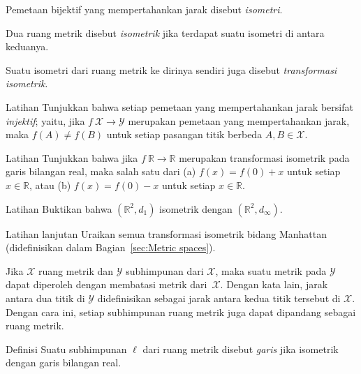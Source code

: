 Pemetaan bijektif yang mempertahankan jarak disebut \emph{isometri}. 

Dua ruang metrik disebut \emph{isometrik} jika terdapat suatu isometri di antara keduanya.

Suatu isometri dari ruang metrik ke dirinya sendiri juga disebut \emph{transformasi isometrik}.

\begin{thm}{Latihan}\label{ex:dist-preserv=>injective}
Tunjukkan bahwa setiap pemetaan yang mempertahankan jarak bersifat \emph{injektif};
yaitu, jika $f\:\mathcal X\to\mathcal Y$ merupakan pemetaan yang mempertahankan jarak, 
maka $f(A)\ne f(B)$ untuk setiap pasangan titik berbeda $A, B\in \mathcal X$.
\end{thm}

\begin{thm}[!]{Latihan}\label{ex:motion-of-R}
Tunjukkan bahwa jika $f\:\mathbb{R}\to\mathbb{R}$ merupakan transformasi isometrik pada garis bilangan real,
maka salah satu dari (a)
$f(x)=f(0)+x$ untuk setiap $x\in \mathbb{R}$, 
atau (b)
$f(x)=f(0)-x$ untuk setiap $x\in \mathbb{R}$. 

\end{thm}

\begin{thm}{Latihan}\label{ex:d_1=d_infty}
Buktikan bahwa $(\mathbb{R}^2,d_1)$ isometrik dengan $(\mathbb{R}^2,d_\infty)$.
\end{thm}

\begin{thm}{Latihan lanjutan}\label{ad-ex:motions of Manhattan plane}
Uraikan semua transformasi isometrik bidang Manhattan (didefinisikan dalam Bagian~\ref{sec:Metric spaces}).
\end{thm}

Jika $\mathcal X$ ruang metrik dan $\mathcal Y$ subhimpunan dari $\mathcal X$,
maka suatu metrik pada $\mathcal Y$ dapat diperoleh dengan membatasi metrik dari~$\mathcal X$. 
Dengan kata lain, 
jarak antara dua titik di $\mathcal Y$ didefinisikan sebagai jarak antara kedua titik tersebut di $\mathcal X$.
Dengan cara ini, setiap subhimpunan ruang metrik juga dapat dipandang sebagai ruang metrik.

\begin{thm}{Definisi}\label{def:line}
Suatu subhimpunan $\ell$ dari ruang metrik disebut \emph{garis} jika isometrik dengan garis bilangan real.
\end{thm}

